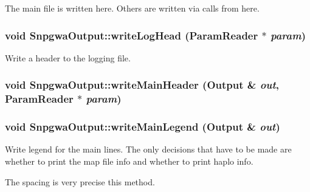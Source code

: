 The main file is written here. Others are written via calls from here. \hypertarget{classSnpgwaOutput_a540b0cec05790adca12054a89ab1b676}{
\subsubsection[{writeLogHead}]{\setlength{\rightskip}{0pt plus 5cm}void SnpgwaOutput::writeLogHead ({\bf ParamReader} $\ast$ {\em param})}}
\label{classSnpgwaOutput_a540b0cec05790adca12054a89ab1b676}
Write a header to the logging file. \hypertarget{classSnpgwaOutput_a0b1354058143385bc05448b3aec6e981}{
\subsubsection[{writeMainHeader}]{\setlength{\rightskip}{0pt plus 5cm}void SnpgwaOutput::writeMainHeader ({\bf Output} \& {\em out}, \/  {\bf ParamReader} $\ast$ {\em param})}}
\label{classSnpgwaOutput_a0b1354058143385bc05448b3aec6e981}
\hypertarget{classSnpgwaOutput_a60154ce496b7b01f476ac7c2d3056004}{
\subsubsection[{writeMainLegend}]{\setlength{\rightskip}{0pt plus 5cm}void SnpgwaOutput::writeMainLegend ({\bf Output} \& {\em out})}}
\label{classSnpgwaOutput_a60154ce496b7b01f476ac7c2d3056004}
Write legend for the main lines. The only decisions that have to be made are whether to print the map file info and whether to print haplo info.

The spacing is very precise this method.


